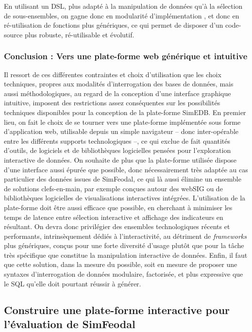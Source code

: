En utilisant un DSL, plus adapté à la manipulation de données qu'à la sélection de sous-ensembles, on gagne donc en modularité d'implémentation , et donc en ré-utilisation de fonctions plus génériques, ce qui permet de disposer d'un code-source plus robuste, ré-utilisable et évolutif.

\subsubsection*{Conclusion : Vers une plate-forme web générique et intuitive}

Il ressort de ces différentes contraintes et choix d'utilisation que les choix techniques, propres aux modalités d'interrogation des bases de données, mais aussi méthodologiques, au regard de la conception d'une interface graphique intuitive, imposent des restrictions assez conséquentes sur les possibilités techniques disponibles pour la conception de la plate-forme SimEDB.
En premier lieu, on fait le choix de se tourner vers une plate-forme implémentée sous forme d'application web, utilisable depuis un simple navigateur -- donc inter-opérable entre les différents supports technologiques --, ce qui exclue de fait quantités d'outils, de logiciels et de bibliothèques logicielles pensées pour l'exploration interactive de données.
On souhaite de plus que la plate-forme utilisée dispose d'une interface aussi épurée que possible, donc nécessairement très adaptée au cas particulier des données issues de SimFeodal, ce qui là aussi élimine un ensemble de solutions \og clefs-en-main\fg{}, par exemple conçues autour des \og webSIG\fg{} ou de bibliothèques logicielles de visualisations interactives intégrées.
L'utilisation de la plate-forme doit être aussi efficace que possible, en cherchant à minimiser les temps de latence entre sélection interactive et affichage des indicateurs en résultant.
On devra donc privilégier des ensembles technologiques récents et performants, intrinsèquement dédiés à l'interactivité, au détriment de \textit{frameworks} plus génériques, conçus pour une forte diversité d'usage plutôt que pour la tâche très spécifique que constitue la manipulation interactive de données.
Enfin, il faut que cette solution, dans la mesure du possible, soit en mesure de proposer une syntaxes d'interrogation de données modulaire, factorisée, et plus expressive que le SQL qu'elle doit pourtant réussir à générer.


\subsection{Construire une plate-forme interactive pour l'évaluation de SimFeodal}

